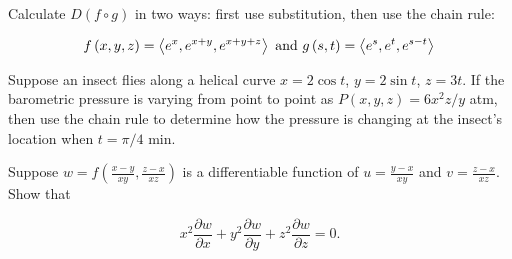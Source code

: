 \documentclass[12pt,letterpaper]{hmcpset}
\newcommand{\pn}[1]{\left( #1 \right)}
\newcommand{\vc}[1]{\left\langle #1 \right\rangle}
\newcommand{\pder}[2]{\frac{\partial #1}{\partial #2}}
\begin{document}
\begin{solution}
\end{solution}

\begin{problem}[3.c]

    Calculate $D\pn{f \circ g}$ in two ways: first use substitution, then use the chain rule:

    \[
        f\pn{x,y,z} = \vc{e^x, e^{x+y}, e^{x+y+z}} \text{ and } g\pn{s,t} = \vc{e^s, e^t, e^{s-t}}\\
    \]

\end{problem}

\begin{solution}
\end{solution}

\begin{problem}[4]

    Suppose an insect flies along a helical curve $x = 2 \cos t$, $y = 2 \sin t$, $z = 3t$. If the barometric pressure is varying from point to point as $P\pn{x, y, z} = 6x^2z/y$ atm, then use the chain rule to determine how the pressure is changing at the insect’s location when $t = \pi /4$ min.

\end{problem}

\begin{solution}
\end{solution}

\begin{problem}[5]

    Suppose $w = f\pn{\frac{x-y}{xy}, \frac{z - x}{xz}}$ is a differentiable function of $u=\frac{y - x}{xy}$ and $v = \frac{z - x}{xz}$. Show that

    \[
        x^2 \pder{w}{x} + y^2 \pder{w}{y} + z^2 \pder{w}{z} = 0.
    \]

\end{problem}

\begin{solution}
\end{solution}
\end{document}
